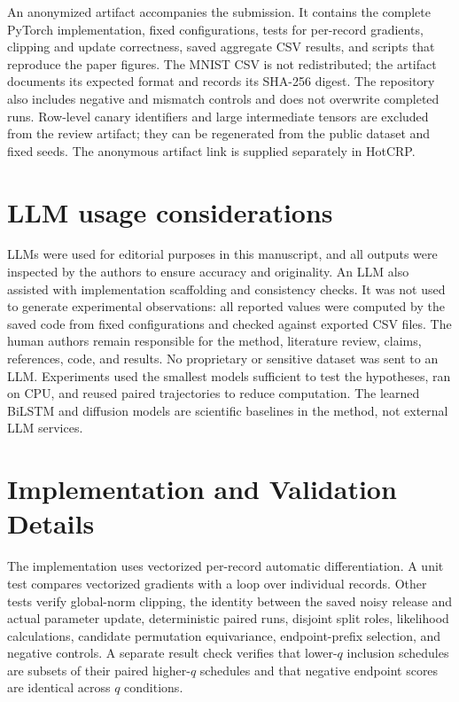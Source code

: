 \documentclass[conference]{IEEEtran}
\begin{document}
An anonymized artifact accompanies the submission. It contains the complete PyTorch implementation, fixed configurations, tests for per-record gradients, clipping and update correctness, saved aggregate CSV results, and scripts that reproduce the paper figures. The MNIST CSV is not redistributed; the artifact documents its expected format and records its SHA-256 digest. The repository also includes negative and mismatch controls and does not overwrite completed runs. Row-level canary identifiers and large intermediate tensors are excluded from the review artifact; they can be regenerated from the public dataset and fixed seeds. The anonymous artifact link is supplied separately in HotCRP.

\section*{LLM usage considerations}

LLMs were used for editorial purposes in this manuscript, and all outputs were inspected by the authors to ensure accuracy and originality. An LLM also assisted with implementation scaffolding and consistency checks. It was not used to generate experimental observations: all reported values were computed by the saved code from fixed configurations and checked against exported CSV files. The human authors remain responsible for the method, literature review, claims, references, code, and results. No proprietary or sensitive dataset was sent to an LLM. Experiments used the smallest models sufficient to test the hypotheses, ran on CPU, and reused paired trajectories to reduce computation. The learned BiLSTM and diffusion models are scientific baselines in the method, not external LLM services.




\appendices

\section{Implementation and Validation Details}

The implementation uses vectorized per-record automatic differentiation. A unit test compares vectorized gradients with a loop over individual records. Other tests verify global-norm clipping, the identity between the saved noisy release and actual parameter update, deterministic paired runs, disjoint split roles, likelihood calculations, candidate permutation equivariance, endpoint-prefix selection, and negative controls. A separate result check verifies that lower-$q$ inclusion schedules are subsets of their paired higher-$q$ schedules and that negative endpoint scores are identical across $q$ conditions.
\end{document}
